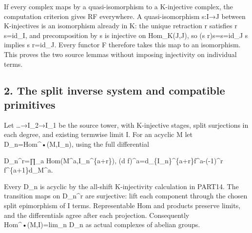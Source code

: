 If every complex maps by a quasi-isomorphism to a K-injective complex,\allowbreak{} the computation criterion gives RF everywhere. A quasi-isomorphism s:\allowbreak{}I\allowbreak{}→J between K-injectives is an isomorphism already in K:\allowbreak{} the unique retraction r satisfies r s\allowbreak{}=id\_\allowbreak{}I,\allowbreak{} and precomposition by s is injective on Hom\_\allowbreak{}K(J,\allowbreak{}J)\allowbreak{},\allowbreak{} so (s r)\allowbreak{}s\allowbreak{}=s\allowbreak{}=id\_\allowbreak{}J s implies s r\allowbreak{}=id\_\allowbreak{}J. Every functor F therefore takes this map to an isomorphism. This proves the two source lemmas without imposing injectivity on individual terms.

\subsection{2. The split inverse system and compatible primitives}\label{proofs-9746-10132-the-split-inverse-system-and-compatible-primitives}

Let …\allowbreak{}→I\_\allowbreak{}2\allowbreak{}→I\_\allowbreak{}1 be the source tower,\allowbreak{} with K-injective stages,\allowbreak{} split surjections in each degree,\allowbreak{} and existing termwise limit I. For an acyclic M let D\_\allowbreak{}n\allowbreak{}=Hom\textasciicircum{}•(M,\allowbreak{}I\_\allowbreak{}n)\allowbreak{},\allowbreak{} using the full differential

D\_\allowbreak{}n\textasciicircum{}r\allowbreak{}=∏\_\allowbreak{}a Hom(M\textasciicircum{}a,\allowbreak{}I\_\allowbreak{}n\textasciicircum{}\{a\allowbreak{}+r\})\allowbreak{},\allowbreak{} (d f)\allowbreak{}\textasciicircum{}a\allowbreak{}=d\_\allowbreak{}\{I\_\allowbreak{}n\}\textasciicircum{}\{a\allowbreak{}+r\}f\textasciicircum{}a-(-1)\allowbreak{}\textasciicircum{}r f\textasciicircum{}\{a\allowbreak{}+1\}d\_\allowbreak{}M\textasciicircum{}a.

Every D\_\allowbreak{}n is acyclic by the all-shift K-injectivity calculation in PART14. The transition maps on D\_\allowbreak{}n\textasciicircum{}r are surjective:\allowbreak{} lift each component through the chosen split epimorphism of I terms. Representable Hom and products preserve limits,\allowbreak{} and the differentials agree after each projection. Consequently Hom\textasciicircum{}•(M,\allowbreak{}I)\allowbreak{}\allowbreak{}=lim\_\allowbreak{}n D\_\allowbreak{}n as actual complexes of abelian groups.

